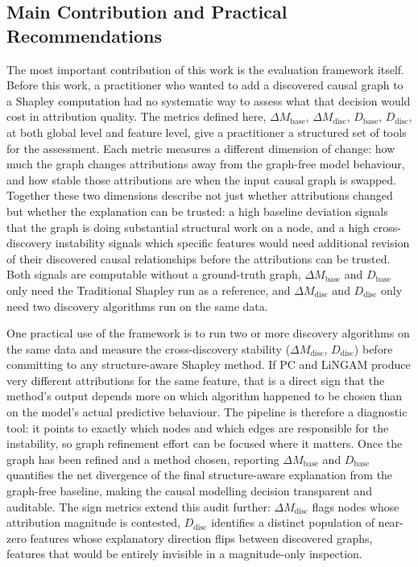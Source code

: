 \documentclass[12pt,a4paper,oneside]{article}
\begin{document}
\subsection{Main Contribution and Practical Recommendations}

The most important contribution of this work is the evaluation framework itself. Before this work, a practitioner who wanted to add a discovered causal graph to a Shapley computation had no systematic way to assess what that decision would cost in attribution quality. The metrics defined here, $\Delta M_{\text{base}}$, $\Delta M_{\text{disc}}$, $D_{\text{base}}$, $D_{\text{disc}}$, at both global level and feature level, give a practitioner a structured set of tools for the assessment. Each metric measures a different dimension of change: how much the graph changes attributions away from the graph-free model behaviour, and how stable those attributions are when the input causal graph is swapped. Together these two dimensions describe not just whether attributions changed but whether the explanation can be trusted: a high baseline deviation signals that the graph is doing substantial structural work on a node, and a high cross-discovery instability signals which specific features would need additional revision of their discovered causal relationships before the attributions can be trusted. Both signals are computable without a ground-truth graph, $\Delta M_{\text{base}}$ and $D_{\text{base}}$ only need the Traditional Shapley run as a reference, and $\Delta M_{\text{disc}}$ and $D_{\text{disc}}$ only need two discovery algorithms run on the same data.

One practical use of the framework is to run two or more discovery algorithms on the same data and measure the cross-discovery stability ($\Delta M_{\text{disc}}$, $D_{\text{disc}}$) before committing to any structure-aware Shapley method. If PC and LiNGAM produce very different attributions for the same feature, that is a direct sign that the method's output depends more on which algorithm happened to be chosen than on the model's actual predictive behaviour. The pipeline is therefore a diagnostic tool: it points to exactly which nodes and which edges are responsible for the instability, so graph refinement effort can be focused where it matters. Once the graph has been refined and a method chosen, reporting $\Delta M_{\text{base}}$ and $D_{\text{base}}$ quantifies the net divergence of the final structure-aware explanation from the graph-free baseline, making the causal modelling decision transparent and auditable. The sign metrics extend this audit further: $\Delta M_{\text{disc}}$ flags nodes whose attribution magnitude is contested, $D_{\text{disc}}$ identifies a distinct population of near-zero features whose explanatory direction flips between discovered graphs, features that would be entirely invisible in a magnitude-only inspection.
\end{document}
